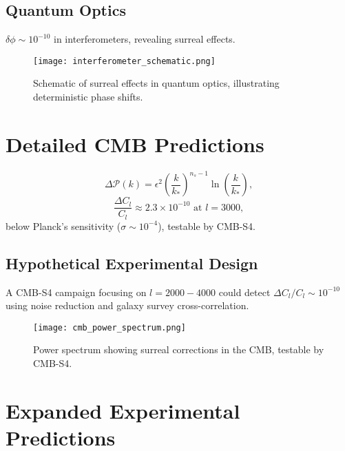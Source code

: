 \documentclass{article}
\begin{document}
\subsection{Quantum Optics}
\(\delta \phi \sim 10^{-10}\) in interferometers, revealing surreal effects.

\begin{figure}[htbp]
    \centering
    \texttt{[image: interferometer\_schematic.png]}
    \caption{Schematic of surreal effects in quantum optics, illustrating deterministic phase shifts.}
    \label{fig:interferometer}
\end{figure}

\section{Detailed CMB Predictions}
\begin{equation}
\Delta \mathcal{P}(k) = \epsilon^2 \left( \frac{k}{k_*} \right)^{n_s-1} \ln \left( \frac{k}{k_*} \right),
\end{equation}
\begin{equation}
\frac{\Delta C_l}{C_l} \approx 2.3 \times 10^{-10} \text{ at } l = 3000,
\end{equation}
below Planck's sensitivity (\(\sigma \sim 10^{-4}\)), testable by CMB-S4.

\subsection{Hypothetical Experimental Design}
A CMB-S4 campaign focusing on \(l = 2000-4000\) could detect \(\Delta C_l / C_l \sim 10^{-10}\) using noise reduction and galaxy survey cross-correlation.

\begin{figure}[htbp]
    \centering
    \texttt{[image: cmb\_power\_spectrum.png]}
    \caption{Power spectrum showing surreal corrections in the CMB, testable by CMB-S4.}
    \label{fig:cmb_spectrum}
\end{figure}

\section{Expanded Experimental Predictions}
\end{document}
